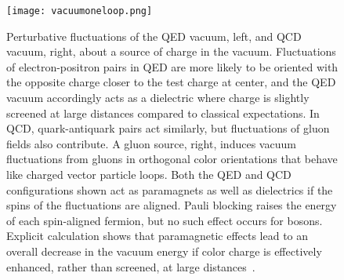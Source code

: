 \begin{figure}[!ht]
  \begin{center}
  \texttt{[image: vacuumoneloop.png]}
  \end{center}
  \caption{
    Perturbative fluctuations of the QED vacuum, left, and QCD vacuum, right, about a source of charge in the vacuum.
    Fluctuations of electron-positron pairs in QED are more likely to be oriented with the opposite charge closer to the test charge at center,
    and the QED vacuum accordingly acts as a dielectric where charge is slightly screened at large distances compared to classical expectations.
    In QCD, quark-antiquark pairs act similarly, but fluctuations of gluon fields also contribute.
    A gluon source, right, induces vacuum fluctuations from gluons in orthogonal color orientations that behave like charged vector particle loops.
    Both the QED and QCD configurations shown act as paramagnets as well as dielectrics if the spins of the fluctuations are aligned.
    Pauli blocking raises the energy of each spin-aligned fermion, but no such effect occurs for bosons.
    Explicit calculation shows that paramagnetic effects lead to an overall decrease in the vacuum energy if color charge is effectively enhanced, rather than screened, at large distances~\cite{Appelquist:1977tw,opac-b1131978}.}
  \label{fig:qcdmagnet}
\end{figure}

